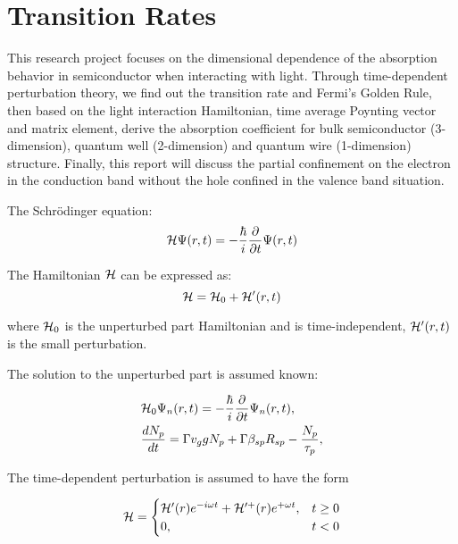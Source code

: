 \chapter{Transition Rates} \label{ch:rates} 

This research project focuses on the dimensional dependence of the absorption
behavior in semiconductor when interacting with light. Through time-dependent
perturbation theory, we find out the transition rate and Fermi’s Golden Rule,
then based on the light interaction Hamiltonian, time average Poynting vector
and matrix element, derive the absorption coefficient for bulk semiconductor
(3-dimension), quantum well (2-dimension) and quantum wire (1-dimension)
structure.  Finally, this report will discuss the partial confinement on the
electron in the conduction band without the hole confined in the valence band
situation.

The Schr{\"o}dinger equation:
\begin{equation}
  \mathcal{H}\Psi(r,t) = - \frac{\hbar}{i}\frac{\partial}{\partial t}\Psi(r,t)
\end{equation}

The Hamiltonian $\mathcal{H}$ can be expressed as:
\begin{equation}
  \mathcal{H} = \mathcal{H}_0 + \mathcal{H}^\prime(r,t)
\end{equation}

where $\mathcal{H}_0$ is the unperturbed part Hamiltonian and is time-independent,
$\mathcal{H}^\prime(r,t)$ is the small perturbation.

The solution to the unperturbed part is assumed known:

\begin{eqnarray}
\begin{aligned}
  & \HAM_0\Psi_n(r,t) = - \frac{\hbar}{i}\frac{\partial }{\partial t}\Psi_n(r,t),
  \\
  & \frac{dN_p}{dt} = {\Gamma}v_g{g}N_p + \Gamma\beta_{sp}R_{sp} - \frac{N_p}{\tau_p},
\end{aligned}
\label{eq:unperturbHAM}
\end{eqnarray}

The time-dependent perturbation is assumed to have the form

\begin{equation}
  \mathcal{H} = \begin{cases}
    \mathcal{H}^\prime(r)e^{-i\omega t} + \mathcal{H}^{\prime+}(r)e^{+\omega t}, & t \geq 0 \\
    0, & t < 0
  \end{cases}
\end{equation}

